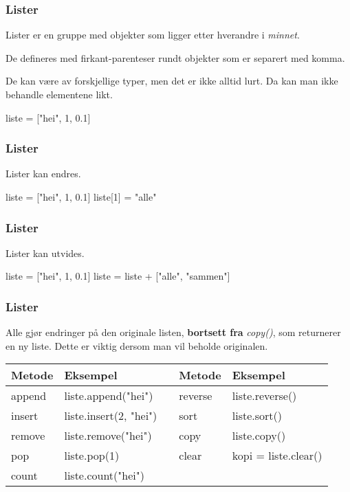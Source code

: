 
\begin{frame}[fragile]
    \frametitle{Lister}

    Lister er en gruppe med objekter som ligger etter hverandre i \textit{minnet}. 
    
    De defineres med firkant-parenteser rundt objekter som er separert med komma. 
    
    De kan være av forskjellige typer, men det er ikke alltid lurt. Da kan man ikke behandle elementene likt. 

\begin{python}
liste = ["hei", 1, 0.1]
\end{python}

\end{frame}

\begin{frame}[fragile]
    \frametitle{Lister}

    Lister kan endres.

\begin{python}
liste = ["hei", 1, 0.1]
liste[1] = "alle"
\end{python}

\end{frame}

\begin{frame}[fragile]
    \frametitle{Lister}

    Lister kan utvides. 

\begin{python}
liste = ["hei", 1, 0.1]
liste = liste + ["alle", "sammen"]
\end{python}

\end{frame}

\begin{frame}
    \frametitle{Lister}

    Alle gjør endringer på den originale listen, \textbf{bortsett fra} \textit{copy()}, som returnerer en ny liste. Dette er viktig dersom man vil beholde originalen. 

    \begin{table}[]
        \begin{tabular}{|l|l|l|l|l|}
        \hline
        Metode & Eksempel               &  & Metode  & Eksempel        \\ \hline
        append & liste.append("hei")    &  & reverse & liste.reverse() \\ \hline
        insert & liste.insert(2, "hei") &  & sort    & liste.sort()    \\ \hline
        remove & liste.remove("hei")    &  & copy    & liste.copy()    \\ \hline
        pop    & liste.pop(1)           &  & clear   & kopi = liste.clear()   \\ \hline
        count  & liste.count("hei")     &  &         &                 \\ \hline
        \end{tabular}
    \end{table}

\end{frame}

